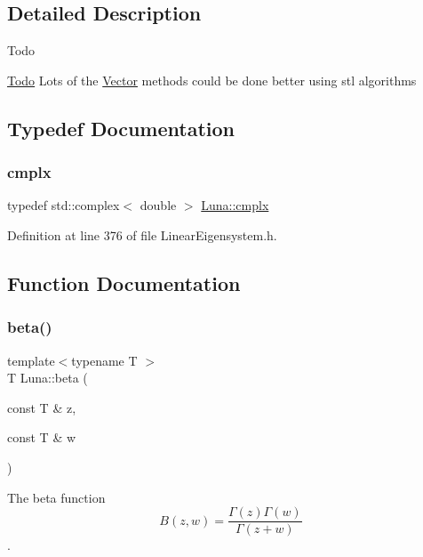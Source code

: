 \subsection{Detailed Description}
\begin{DoxyRefDesc}{Todo}
\item[\hyperlink{todo__todo000001}{Todo}]Lots of the \hyperlink{classLuna_1_1Vector}{Vector} methods could be done better using stl algorithms \end{DoxyRefDesc}


\subsection{Typedef Documentation}
\mbox{\label{namespaceLuna_af3257e90072a78a8ffb16a16773aa18e}} 
\subsubsection{\texorpdfstring{cmplx}{cmplx}}
{\footnotesize\ttfamily typedef std\+::complex$<$ double $>$ \hyperlink{namespaceLuna_af3257e90072a78a8ffb16a16773aa18e}{Luna\+::cmplx}}



Definition at line 376 of file Linear\+Eigensystem.\+h.



\subsection{Function Documentation}
\mbox{\label{namespaceLuna_af542f1c7522ca96017105e160b54df80}} 
\subsubsection{\texorpdfstring{beta()}{beta()}}
{\footnotesize\ttfamily template$<$typename T $>$ \\
T Luna\+::beta (\begin{DoxyParamCaption}\item[{const T \&}]{z,  }\item[{const T \&}]{w }\end{DoxyParamCaption})}



The beta function \[ B(z,w)=\frac{\Gamma(z)\Gamma(w)}{\Gamma(z+w)} \]. 


